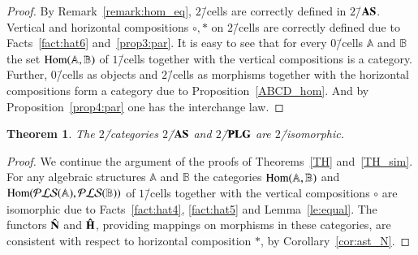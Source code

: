 \documentclass[12pt]{article}
\newtheorem{theorem}{Theorem}
\theoremstyle{definition}
\def\MA{{\mathbb{A}}}
\def\MB{{\mathbb{B}}}
\def\PLS{{\mathcal{PLS}}}
\begin{document}
\begin{proof}
By Remark~\ref{remark:hom_eq}, $2$\=/cells are correctly defined in $2$\=/${\bf AS}$. Vertical and horizontal compositions $\circ,\ast$ on $2$\=/cells are correctly defined due to Facts~\ref{fact:hat6} and~\ref{prop3:par}. It is easy to see that for every $0$\=/cells $\MA$ and $\MB$ the set ${\rm Hom}(\MA,\MB)$ of $1$\=/cells together with the vertical compositions is a category. Further, $0$\=/cells as objects and $2$\=/cells as morphisms together with the horizontal compositions form a category due to Proposition~\ref{ABCD_hom}. And by Proposition~\ref{prop4:par} one has the interchange law.
\end{proof}

\begin{theorem}\label{th:2cat}
The $2$\=/categories $2$\=/${\bf AS}$ and $2$\=/${\bf PLG}$ are $2$\=/isomorphic. 
\end{theorem}

\begin{proof}
We continue the argument of the proofs of Theorems~\ref{TH} and~\ref{TH_sim}. For any algebraic structures $\MA$ and $\MB$ the categories ${\rm Hom}(\MA,\MB)$ and ${\rm Hom}(\PLS(\MA),\PLS(\MB))$ of $1$\=/cells together with the vertical compositions $\circ$ are isomorphic due to Facts~\ref{fact:hat4}, \ref{fact:hat5} and Lemma~\ref{le:equal}. The functors ${\bf \hat N}$ and ${\bf \hat H}$, providing mappings on morphisms in these categories, are consistent with respect to horizontal composition $\ast$, by Corollary~\ref{cor:ast_N}.
\end{proof}

\newpage
{}
\end{document}
